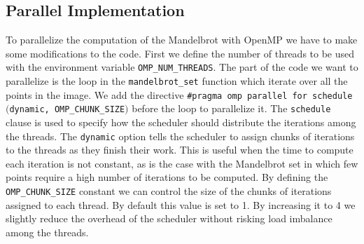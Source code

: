\subsection{Parallel Implementation}
    To parallelize the computation of the Mandelbrot with OpenMP we have to
    make some modifications to the code. First we define the number of threads
    to be used with the environment variable \texttt{OMP\_NUM\_THREADS}.
    The part of the code we want to parallelize is the loop in the \texttt{mandelbrot\_set}
    function which iterate over all the points in the image. We add the directive
    \texttt{\#pragma omp parallel for schedule $($dynamic, OMP\_CHUNK\_SIZE$)$} before
    the loop to parallelize it. The \texttt{schedule} clause is used to specify how
    the scheduler should distribute the iterations among the threads. The \texttt{dynamic}
    option tells the scheduler to assign chunks of iterations to the threads as they
    finish their work. This is useful when the time to compute each iteration is not
    constant, as is the case with the Mandelbrot set in which few points require
    a high number of iterations to be computed. By defining the \texttt{OMP\_CHUNK\_SIZE}
    constant we can control the size of the chunks of iterations assigned to each thread.
    By default this value is set to 1. By increasing it to 4 we slightly reduce the overhead
    of the scheduler without risking load imbalance among the threads. \\

